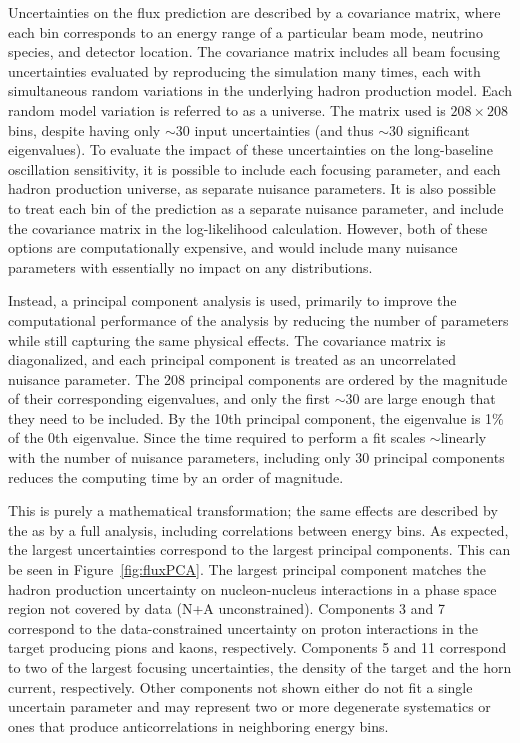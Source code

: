 Uncertainties on the flux prediction are described by a covariance matrix, where each bin corresponds to an energy range of a particular beam mode, neutrino species, and detector location. The covariance matrix includes all beam focusing uncertainties evaluated by reproducing the simulation many times, each with simultaneous random variations in the underlying hadron production model. Each random model variation is referred to as a universe. The  matrix used is $208 \times 208$ bins, despite having only $\sim$30 input uncertainties (and thus $\sim$30 significant eigenvalues). To evaluate the impact of these uncertainties on the long-baseline oscillation sensitivity, it is possible to include each focusing parameter, and each hadron production universe, as separate nuisance parameters. It is also possible to treat each bin of the prediction as a separate nuisance parameter, and include the covariance matrix in the log-likelihood calculation. However, both of these options are computationally expensive, and would include many nuisance parameters with essentially no impact on any distributions.

Instead, a principal component analysis is used, primarily to improve the computational performance of the analysis by reducing the number of parameters while still capturing the same physical effects. The covariance matrix is diagonalized, and each principal component is treated as an uncorrelated nuisance parameter. The 208 principal components are ordered by the magnitude of their corresponding eigenvalues, and only the first $\sim$30 are large enough that they need to be included. By the 10th principal component, the eigenvalue is 1\% of the 0th eigenvalue. Since the time required to perform a fit scales $\sim$linearly with the number of nuisance parameters, including only 30 principal components reduces the computing time by an order of magnitude.

This is purely a mathematical transformation; the same effects are described by the  as by a full analysis, including correlations between energy bins. As expected, the largest uncertainties correspond to the largest principal components. This can be seen in Figure~\ref{fig:fluxPCA}. The largest principal component matches the hadron production uncertainty on nucleon-nucleus interactions in a phase space region not covered by data (N+A unconstrained). Components 3 and 7 correspond to the data-constrained uncertainty on proton interactions in the target producing pions and kaons, respectively. Components 5 and 11 correspond to two of the largest focusing uncertainties, the density of the target and the horn current, respectively. Other components not shown either do not fit a single uncertain parameter and may represent two or more degenerate systematics or ones that produce anticorrelations in neighboring energy bins.

